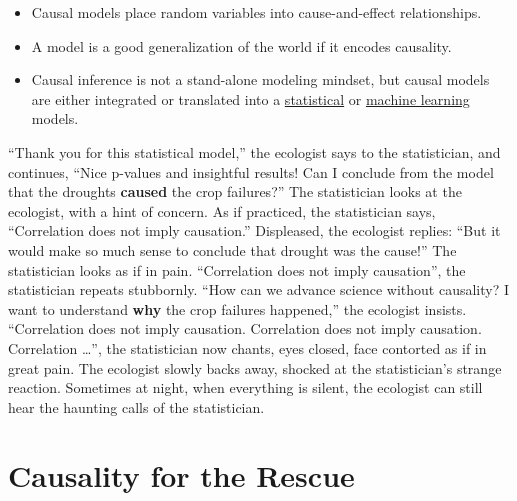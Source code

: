 \documentclass[
  10pt,
]{scrbook}
\providecommand{\tightlist}{%
  \setlength{\itemsep}{0pt}\setlength{\parskip}{0pt}}
\begin{document}
\begin{itemize}
\tightlist
\item
  Causal models place random variables into cause-and-effect relationships.
\item
  A model is a good generalization of the world if it encodes causality.
\item
  Causal inference is not a stand-alone modeling mindset, but causal models are either integrated or translated into a \protect\hyperlink{statistical-modeling}{statistical} or \protect\hyperlink{machine-learning}{machine learning} models.
\end{itemize}

``Thank you for this statistical model,'' the ecologist says to the statistician, and continues, ``Nice p-values and insightful results! Can I conclude from the model that the droughts \textbf{caused} the crop failures?''
The statistician looks at the ecologist, with a hint of concern.
As if practiced, the statistician says, ``Correlation does not imply causation.''
Displeased, the ecologist replies: ``But it would make so much sense to conclude that drought was the cause!''
The statistician looks as if in pain.
``Correlation does not imply causation'', the statistician repeats stubbornly.
``How can we advance science without causality? I want to understand \textbf{why} the crop failures happened,'' the ecologist insists.
``Correlation does not imply causation. Correlation does not imply causation. Correlation \ldots{}'', the statistician now chants, eyes closed, face contorted as if in great pain.
The ecologist slowly backs away, shocked at the statistician's strange reaction.
Sometimes at night, when everything is silent, the ecologist can still hear the haunting calls of the statistician.

\hypertarget{causality-for-the-rescue}{%
\section{Causality for the Rescue}\label{causality-for-the-rescue}}
\end{document}
